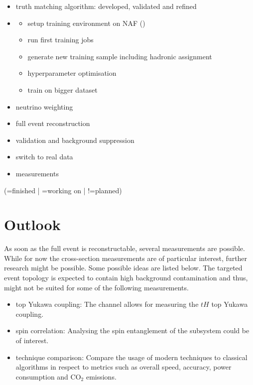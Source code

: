 \documentclass[bachelor,ngerman,english]{GAUBM}
\begin{document}
\begin{itemize}[nosep]
    \item[\ding{52}] truth matching algorithm: developed, validated and refined
    \item[\ding{220}] \spanet 
    \begin{itemize}
        \item[\ding{52}] setup training environment on NAF (\desy)
        \item[\ding{52}] run first \spanet training jobs
        \item[\ding{220}] generate new training sample including hadronic \HWW assignment
        \item[\ding{220}] hyperparameter optimisation
        \item[\ding{220}] train on bigger dataset
    \end{itemize}
    \item[\ding{220}] neutrino weighting
    \item[!] full event reconstruction
    \item[!] validation and background suppression
    \item[!] switch to real data
    \item[!] measurements
\end{itemize}

\begin{center}
    (=finished | =working on | !=planned)
\end{center}


\section{Outlook}
\label{sec:status:outlook}
As soon as the full event is reconstructable, several measurements are possible. While for now the cross-section measurements are of particular interest, further research might be possible. Some possible ideas are listed below. The targeted event topology is expected to contain high background contamination and thus, might not be suited for some of the following measurements.

\begin{itemize}
    \item top Yukawa coupling: The channel allows for measuring the $tH$ top Yukawa coupling.
    \item spin correlation: Analysing the spin entanglement of the \HWW subsystem could be of interest.
    \item technique comparison: Compare the usage of modern techniques to classical algorithms in respect to metrics such as overall speed, accuracy, power consumption and CO$_2$ emissions.
\end{itemize}


 
\end{document}
